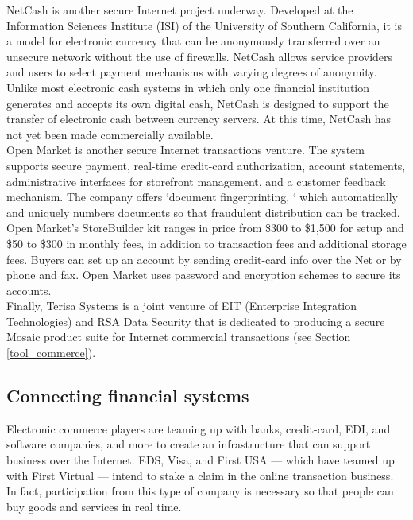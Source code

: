NetCash is another secure Internet project underway. Developed at the
Information Sciences Institute (ISI) of the University of Southern
California, it is a model for electronic currency that can be
anonymously transferred over an unsecure network without the use of
firewalls. NetCash allows service providers and users to select payment
mechanisms with varying degrees of anonymity.\\

Unlike most electronic cash systems in which only one financial
institution generates and accepts its own digital cash, NetCash is
designed to support the transfer of electronic cash between currency
servers. At this time, NetCash has not yet been made commercially
available.\\

Open Market is another secure Internet transactions venture. The system
supports secure payment, real-time credit-card authorization, account
statements, administrative interfaces for storefront management, and a
customer feedback mechanism. The company offers `document
fingerprinting, ` which automatically and uniquely numbers documents so
that fraudulent distribution can be tracked.\\

Open Market's StoreBuilder kit ranges in price from \$300 to \$1,500 for
setup and \$50 to \$300 in monthly fees, in addition to transaction fees
and additional storage fees. Buyers can set up an account by sending
credit-card info over the Net or by phone and fax. Open Market uses
password and encryption schemes to secure its accounts.\\

Finally, Terisa Systems is a joint venture of EIT (Enterprise
Integration Technologies) and RSA Data Security that is dedicated to
producing a secure Mosaic product suite for Internet commercial
transactions (see Section \ref{tool_commerce}).\\

\subsection{Connecting financial systems}
Electronic commerce players are teaming up with banks, credit-card, EDI,
and software companies, and more to create an infrastructure that can
support business over the Internet. EDS, Visa, and First USA --- which have
teamed up with First Virtual --- intend to stake a claim in the online
transaction business. In fact, participation from this type of company is
necessary so that people can buy goods and services in real time.\\

